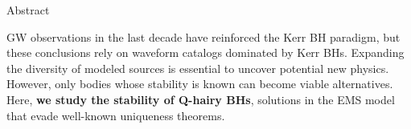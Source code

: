 \begin{block}{Abstract}

\Gls{GW} observations in the last decade have reinforced the Kerr \gls{BH} paradigm, but these conclusions rely on waveform catalogs dominated by Kerr \glspl{BH}. Expanding the diversity of modeled sources is essential to uncover potential new physics. However, only bodies whose stability is known can become viable alternatives. Here, \textbf{we study the stability of Q-hairy \glspl{BH}}, solutions in the \gls{EMS} model that evade well-known uniqueness theorems.

\end{block}
